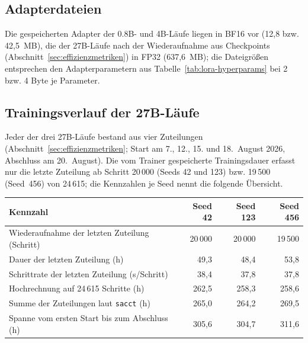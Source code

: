\subsection{Adapterdateien}
\label{app:adapter}

Die gespeicherten Adapter der 0.8B- und 4B-Läufe liegen in BF16 vor
(12,8 bzw. 42,5~MB), die der 27B-Läufe nach der Wiederaufnahme aus
Checkpoints (Abschnitt~\ref{sec:effizienzmetriken}) in FP32 (637,6~MB);
die Dateigrößen entsprechen den Adapterparametern aus
Tabelle~\ref{tab:lora-hyperparams} bei 2 bzw. 4 Byte je Parameter.

\subsection{Trainingsverlauf der 27B-Läufe}
\label{app:training-27b}

Jeder der drei 27B-Läufe bestand aus vier Zuteilungen
(Abschnitt~\ref{sec:effizienzmetriken}; Start am 7., 12., 15. und
18.~August 2026, Abschluss am 20.~August).
Die vom Trainer gespeicherte Trainingsdauer erfasst nur die letzte Zuteilung ab
Schritt 20\,000 (Seeds 42 und 123) bzw. 19\,500 (Seed~456) von
24\,615; die Kennzahlen je Seed nennt die folgende Übersicht.

\begin{center}
  \small
  \begin{tabular}{lrrr}
    \toprule
    \textbf{Kennzahl} & \textbf{Seed 42} & \textbf{Seed 123} & \textbf{Seed 456} \\
    \midrule
    
    Wiederaufnahme der letzten Zuteilung (Schritt) & 20\,000 & 20\,000 & 19\,500 \\
    
    Dauer der letzten Zuteilung (h) & 49,3 & 48,4 & 53,8 \\
    Schrittrate der letzten Zuteilung (s/Schritt) & 38,4 & 37,8 & 37,8 \\
    Hochrechnung auf 24\,615 Schritte (h) & 262,5 & 258,3 & 258,6 \\
    Summe der Zuteilungen laut \texttt{sacct} (h) & 265,0 & 264,2 & 269,5 \\
    Spanne vom ersten Start bis zum Abschluss (h) & 305,6 & 304,7 & 311,6 \\
    \bottomrule
  \end{tabular}
\end{center}


